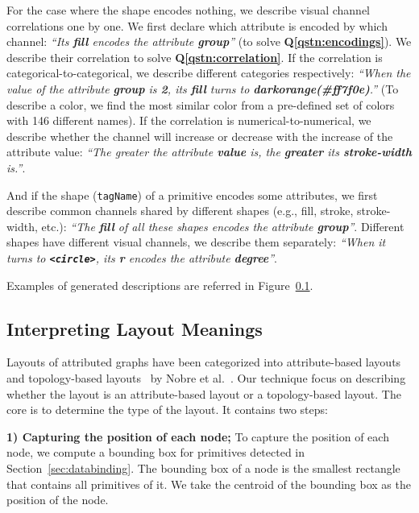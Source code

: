 For the case where the shape encodes nothing, we describe visual channel correlations one by one.
We first declare which attribute is encoded by which channel: \textit{``Its \textbf{\color{text-highlight}fill} encodes the attribute \textbf{\color{text-highlight}group}''} (to solve \textbf{Q\ref{qstn:encodings}}).
We describe their correlation to solve \textbf{Q\ref{qstn:correlation}}.
If the correlation is categorical-to-categorical, we describe different categories respectively: \textit{``When the value of the attribute \textbf{\color{text-highlight}group} is \textbf{\color{text-highlight}2}, its \textbf{\color{text-highlight}fill} turns to \textbf{\color{text-highlight}darkorange(\#ff7f0e)}.''} (To describe a color, we find the most similar color from a pre-defined set of colors with 146 different names).
If the correlation is numerical-to-numerical, we describe whether the channel will increase or decrease with the increase of the attribute value: \textit{``The greater the attribute \textbf{\color{text-highlight}value} is, the \textbf{\color{text-highlight}greater} its \textbf{\color{text-highlight}stroke-width} is.''}.

And if the shape (\texttt{tagName}) of a primitive encodes some attributes, we first describe common channels shared by different shapes (e.g., fill, stroke, stroke-width, etc.): \textit{``The \textbf{\color{text-highlight}fill} of all these shapes encodes the attribute \textbf{\color{text-highlight}group}''}.
Different shapes have different visual channels, we describe them separately: \textit{``When it turns to \textbf{\color{text-highlight}\texttt{<circle>}}, its \textbf{\color{text-highlight}r} encodes the attribute \textbf{\color{text-highlight}degree}''}.

Examples of generated descriptions are referred in Figure~\ref{}.

\subsection{Interpreting Layout Meanings}
Layouts of attributed graphs have been categorized into attribute-based layouts~\cite{} and topology-based layouts~\cite{} by Nobre et al.~\cite{DBLP:journals/cgf/NobreMSL19}.
Our technique focus on describing whether the layout is an attribute-based layout or a topology-based layout.
The core is to determine the type of the layout.
It contains two steps: 

\textbf{1) Capturing the position of each node;} To capture the position of each node, we compute a bounding box for primitives detected in Section~\ref{sec:databinding}.
The bounding box of a node is the smallest rectangle that contains all primitives of it.
We take the centroid of the bounding box as the position of the node.

